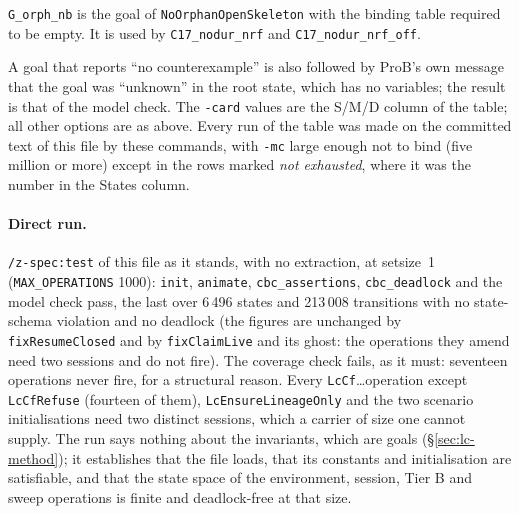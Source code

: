 \documentclass[a4paper,10pt,fleqn]{article}
\newcommand{\field}[1]{\texttt{#1}}
\begin{document}
\noindent \texttt{G\_orph\_nb} is the goal of \texttt{NoOrphanOpenSkeleton}
with the binding table required to be empty. It is used by
\texttt{C17\_nodur\_nrf} and \texttt{C17\_nodur\_nrf\_off}.

\noindent A goal that reports ``no counterexample'' is also followed by
ProB's own message that the goal was ``unknown'' in the root state, which
has no variables; the result is that of the model check. The \texttt{-card}
values are the S/M/D column of the table; all other options are as above.
Every run of the table was made on the committed text of this file by these
commands, with \texttt{-mc} large enough not to bind (five million or more)
except in the rows marked \emph{not exhausted}, where it was the number in
the States column.

\paragraph{Direct run.} \texttt{/z-spec:test} of this file as it stands, with
no extraction, at setsize~1 (\field{MAX\_OPERATIONS} 1000): \texttt{init},
\texttt{animate}, \texttt{cbc\_assertions}, \texttt{cbc\_deadlock} and the
model check pass, the last over 6\,496 states and 213\,008 transitions with no
state-schema violation and no deadlock (the figures are unchanged by
\field{fixResumeClosed} and by \field{fixClaimLive} and its ghost: the operations they amend need two sessions and do not fire). The coverage check fails, as it must:
seventeen operations never fire, for a structural reason. Every
\field{LcCf}\ldots operation except \field{LcCfRefuse}
(fourteen of them), \field{LcEnsureLineageOnly} and the two scenario
initialisations need two distinct sessions, which a carrier of size one cannot
supply. The run says nothing about the invariants, which are goals
(\S\ref{sec:lc-method}); it establishes that the file loads, that its
constants and initialisation are satisfiable, and that the state space of the
environment, session, Tier B and sweep operations is finite and deadlock-free
at that size.
\end{document}
